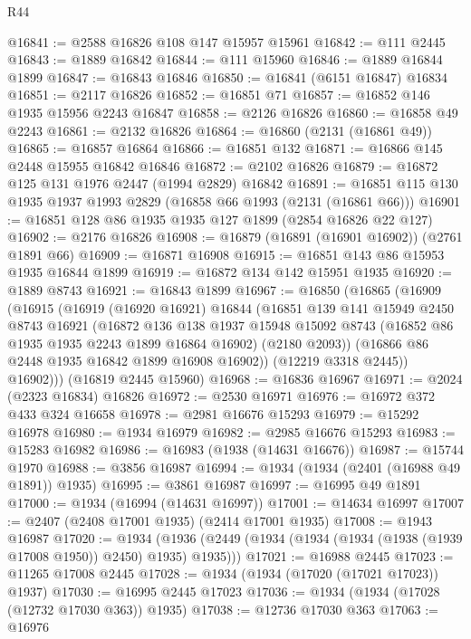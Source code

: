 \begin{lexlean}{R44}
\begin{coremodule}
@16841 := @2588 @16826 @108 @147 @15957 @15961
@16842 := @111 @2445
@16843 := @1889 @16842
@16844 := @111 @15960
@16846 := @1889 @16844 @1899
@16847 := @16843 @16846
@16850 := @16841 (@6151 @16847) @16834
@16851 := @2117 @16826
@16852 := @16851 @71
@16857 := @16852 @146 @1935 @15956 @2243 @16847
@16858 := @2126 @16826
@16860 := @16858 @49 @2243
@16861 := @2132 @16826
@16864 := @16860 (@2131 (@16861 @49))
@16865 := @16857 @16864
@16866 := @16851 @132
@16871 := @16866 @145 @2448 @15955 @16842 @16846
@16872 := @2102 @16826
@16879 := @16872 @125 @131 @1976 @2447 (@1994 @2829) @16842
@16891 := @16851 @115 @130 @1935 @1937 @1993 @2829 (@16858 @66 @1993 (@2131 (@16861 @66)))
@16901 := @16851 @128 @86 @1935 @1935 @127 @1899 (@2854 @16826 @22 @127)
@16902 := @2176 @16826
@16908 := @16879 (@16891 (@16901 @16902)) (@2761 @1891 @66)
@16909 := @16871 @16908
@16915 := @16851 @143 @86 @15953 @1935 @16844 @1899
@16919 := @16872 @134 @142 @15951 @1935
@16920 := @1889 @8743
@16921 := @16843 @1899
@16967 := @16850
    (@16865
      (@16909
        (@16915
          (@16919
            (@16920 @16921)
            @16844
            (@16851
              @139
              @141
              @15949
              @2450
              @8743
              @16921
              (@16872
                @136
                @138
                @1937
                @15948
                @15092
                @8743
                (@16852 @86 @1935 @1935 @2243 @1899 @16864 @16902)
                (@2180 @2093))
              (@16866 @86 @2448 @1935 @16842 @1899 @16908 @16902))
            (@12219 @3318 @2445))
          @16902)))
    (@16819 @2445 @15960)
@16968 := @16836 @16967
@16971 := @2024 (@2323 @16834) @16826
@16972 := @2530 @16971
@16976 := @16972 @372 @433 @324 @16658
@16978 := @2981 @16676 @15293
@16979 := @15292 @16978
@16980 := @1934 @16979
@16982 := @2985 @16676 @15293
@16983 := @15283 @16982
@16986 := @16983 (@1938 (@14631 @16676))
@16987 := @15744 @1970
@16988 := @3856 @16987
@16994 := @1934 (@1934 (@2401 (@16988 @49 @1891)) @1935)
@16995 := @3861 @16987
@16997 := @16995 @49 @1891
@17000 := @1934 (@16994 (@14631 @16997))
@17001 := @14634 @16997
@17007 := @2407 (@2408 @17001 @1935) (@2414 @17001 @1935)
@17008 := @1943 @16987
@17020 := @1934
    (@1936 (@2449 (@1934 (@1934 (@1934 (@1938 (@1939 @17008 @1950)) @2450) @1935) @1935)))
@17021 := @16988 @2445
@17023 := @11265 @17008 @2445
@17028 := @1934 (@1934 (@17020 (@17021 @17023)) @1937)
@17030 := @16995 @2445 @17023
@17036 := @1934 (@1934 (@17028 (@12732 @17030 @363)) @1935)
@17038 := @12736 @17030 @363
@17063 := @16976

\end{coremodule}
\end{lexlean}
